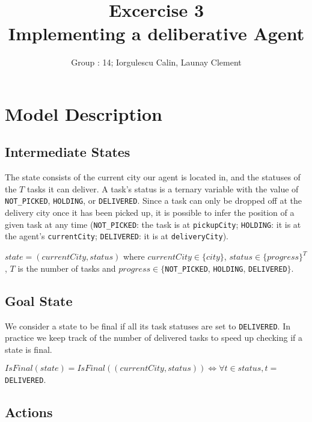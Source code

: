 \documentclass[11pt]{article}
\title{\bf Excercise 3\\ Implementing a deliberative Agent}
\author{Group \textnumero : 14; Iorgulescu Calin, Launay Clement}
\begin{document}
\maketitle

\section{Model Description}

\subsection{Intermediate States}

The state consists of the current city our agent is located in, and the statuses
of the $T$ tasks it can deliver. A task's status is a ternary variable with the
value of \verb|NOT_PICKED|, \verb|HOLDING|, or \verb|DELIVERED|. Since a task
can only be dropped off at the delivery city once it has been picked up, it is
possible to infer the position of a given task at any time (\verb|NOT_PICKED|:
the task is at \verb|pickupCity|; \verb|HOLDING|: it is at the agent's
\verb|currentCity|; \verb|DELIVERED|: it is at \verb|deliveryCity|).

$state = (currentCity, status)$ where $currentCity \in \{city\}$, $status \in \{progress\}^T$, $T$ is the number of tasks and $progress \in \{$\verb|NOT_PICKED|, \verb|HOLDING|, \verb|DELIVERED|$\}$.

\subsection{Goal State}

We consider a state to be final if all its task statuses are set to
\verb|DELIVERED|. In practice we keep track of the number of delivered tasks to
speed up checking if a state is final.

$IsFinal(state) = IsFinal((currentCity, status)) \Longleftrightarrow \forall t \in status, t =$\verb| DELIVERED|.

\subsection{Actions}
\end{document}
